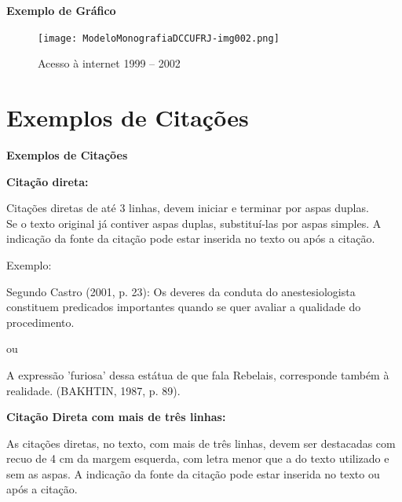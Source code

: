 \bigskip
\clearpage

{\centering\bfseries\color{red}
Exemplo de Gráfico
\par}
\begin{figure}[ht]
    \centering
    \caption{Acesso à internet 1999 – 2002}
    \texttt{[image: ModeloMonografiaDCCUFRJ-img002.png]} 
    \label{fig:internet}
\end{figure}


\clearpage
\section{Exemplos de Citações}
{\centering\bfseries\color{red}
Exemplos de Citações
\par}

{\centering\bfseries\color{red}
Citação direta:
\par}

\bigskip

Citações diretas de até 3 linhas, devem iniciar e terminar por aspas duplas.\\

Se o texto original já contiver aspas duplas, substituí-las por aspas simples. A indicação da fonte da citação pode
estar inserida no texto ou após a citação.\\

\bigskip

{\color{red}
Exemplo:}

\bigskip

Segundo Castro (2001, p. 23): {\textquotedbl}Os deveres da conduta do anestesiologista constituem predicados importantes
quando se quer avaliar a qualidade do procedimento.{\textquotedbl}\\

\bigskip

{\color{red}
ou}

\bigskip

{
{\textquotedbl}A expressão 'furiosa' dessa estátua de que fala Rebelais, corresponde também à realidade.{\textquotedbl}
(BAKHTIN, 1987, p. 89).}

\bigskip

{\centering\bfseries\color{red}
Citação Direta com mais de três linhas:
\par}

\bigskip

As citações diretas, no texto, com mais de três linhas, devem ser
destacadas com recuo de 4 cm da margem esquerda, com letra menor que a do texto utilizado e sem as aspas. A indicação da fonte da citação pode estar inserida no texto ou após a citação. \\ 

